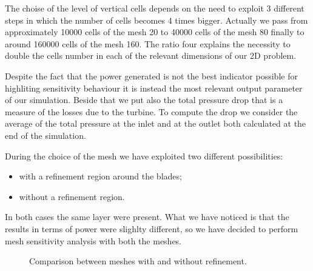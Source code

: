 \documentclass[a4paper,12pt]{article}
\begin{document}
The choise of the level of vertical cells depends on the need to exploit 3 different steps in which the number of cells becomes 4 times bigger. Actually we pass from approximately 10000 cells of the mesh 20 to 40000 cells of the mesh 80 finally to around 160000 cells of the mesh 160. 
The ratio four explains the necessity to double the cells number in each of the relevant dimensions of our 2D problem.

Despite the fact that the power generated is not the best indicator possible for highliting sensitivity behaviour it is instead the most relevant output parameter of our simulation.
Beside that we put also the total pressure drop that is a measure of the losses due to the turbine.
To compute the drop we consider the average of the total pressure at the inlet and at the outlet both calculated at the end of the simulation.

During the choice of the mesh we have exploited two different possibilities:
\begin{itemize}
\item with a refinement region around the blades;
\item without a refinement region.
\end{itemize}
In both cases the same layer were present.
What we have noticed is that the results in terms of power were slighlty different, so we have decided to perform mesh sensitivity analysis with both the meshes.

\begin{figure}
\hfill
{}
\caption{Comparison between meshes with and without refinement.}
\end{figure}
\end{document}
